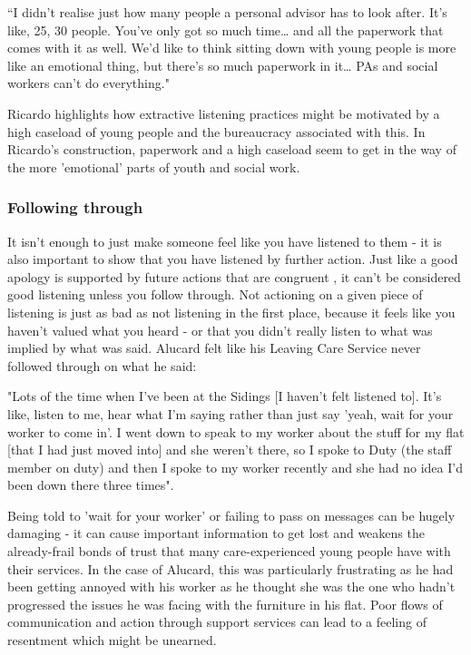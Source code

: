“I didn’t realise just how many people a personal advisor has to look after. It’s like, 25, 30 people. You’ve only got so much time… and all the paperwork that comes with it as well. We’d like to think sitting down with young people is more like an emotional thing, but there’s so much paperwork in it… PAs and social workers can’t do everything."

Ricardo highlights how extractive listening practices might be motivated by a high caseload of young people and the bureaucracy associated with this. In Ricardo's construction, paperwork and a high caseload seem to get in the way of the more 'emotional' parts of youth and social work.

\subsubsection{Following through}
It isn't enough to just make someone feel like you have listened to them - it is also important to show that you have listened by further action. Just like a good apology is supported by future actions that are congruent , it can't be considered good listening unless you follow through. Not actioning on a given piece of listening is just as bad as not listening in the first place, because it feels like you haven't valued what you heard - or that you didn't really listen to what was implied by what was said.
Alucard felt like his Leaving Care Service never followed through on what he said:

"Lots of the time when I've been at the Sidings [I haven't felt listened to]. It's like, listen to me, hear what I'm saying rather than just say 'yeah, wait for your worker to come in'. I went down to speak to my worker about the stuff for my flat [that I had just moved into] and she weren't there, so I spoke to Duty (the staff member on duty) and then I spoke to my worker recently and she had no idea I'd been down there three times".

Being told to 'wait for your worker' or failing to pass on messages can be hugely damaging - it can cause important information to get lost and weakens the already-frail bonds of trust that many care-experienced young people have with their services. In the case of Alucard, this was particularly frustrating as he had been getting annoyed with his worker as he thought she was the one who hadn't progressed the issues he was facing with the furniture in his flat. Poor flows of communication and action through support services can lead to a feeling of resentment which might be unearned.

